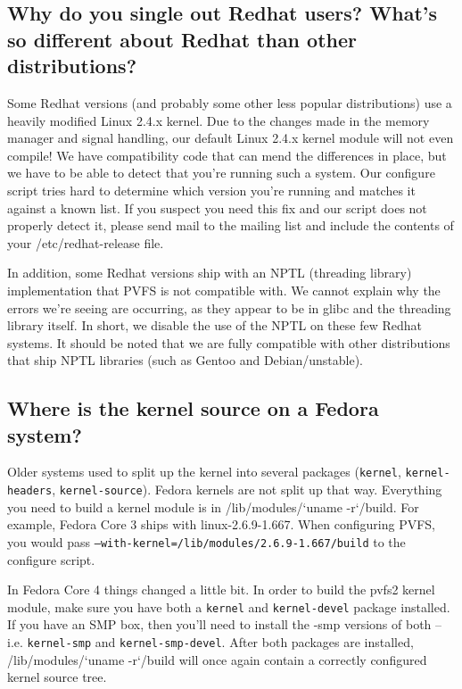 \documentclass[11pt,letterpaper]{article}
\begin{document}
\subsection{Why do you single out Redhat users?  What's so different
  about Redhat than other distributions?}

Some Redhat versions (and probably some other less popular
distributions) use a heavily modified Linux 2.4.x kernel.  Due to the
changes made in the memory manager and signal handling, our default
Linux 2.4.x kernel module will not even compile!  We have
compatibility code that can mend the differences in place, but we have
to be able to detect that you're running such a system.  Our configure
script tries hard to determine which version you're running and
matches it against a known list.  If you suspect you need this fix and
our script does not properly detect it, please send mail to the
mailing list and include the contents of your /etc/redhat-release
file.

In addition, some Redhat versions ship with an NPTL (threading
library) implementation that PVFS is not compatible with.  We cannot
explain why the errors we're seeing are occurring, as they appear to be
in glibc and the threading library itself.  In short, we disable the
use of the NPTL on these few Redhat systems.  It should be noted that
we are fully compatible with other distributions that ship NPTL
libraries (such as Gentoo and Debian/unstable).

\subsection{Where is the kernel source on a Fedora system?}

Older systems used to split up the kernel into several packages
(\texttt{kernel}, \texttt{kernel-headers}, \texttt{kernel-source}).
Fedora kernels are not split up that way.  Everything you need to build a
kernel module is in /lib/modules/`uname -r`/build.  For example, Fedora
Core 3 ships with linux-2.6.9-1.667.  When configuring PVFS, you would
pass \texttt{--with-kernel=/lib/modules/2.6.9-1.667/build} to the
configure script.

In Fedora Core 4 things changed a little bit.  In order to build the pvfs2
kernel module, make sure you have both a \texttt{kernel} and
\texttt{kernel-devel} package installed.  If you have an SMP box, then you'll
need to install the -smp versions of both -- i.e. \texttt{kernel-smp} and
\texttt{kernel-smp-devel}.   After both packages are installed,
/lib/modules/`uname -r`/build will once again contain a correctly configured
kernel source tree.
\end{document}
